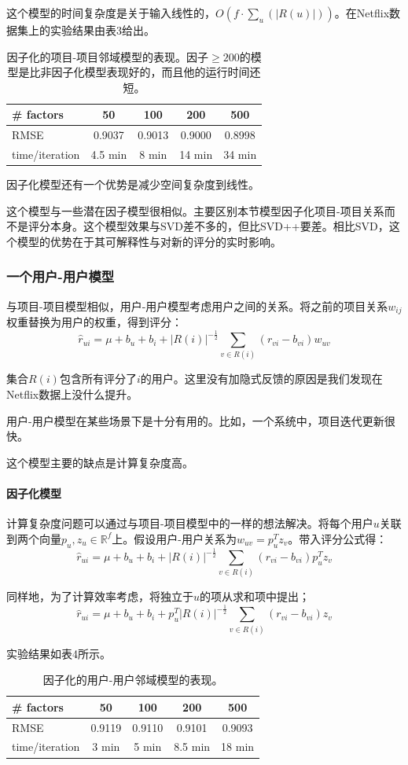 \documentclass{article}
\begin{document}
这个模型的时间复杂度是关于输入线性的，$O(f\cdot\sum_u(|R(u)|))$。在Netflix数据集上的实验结果由表3给出。
\begin{table}[htb]
\centering
\caption{因子化的项目-项目邻域模型的表现。因子$\geq 200$的模型是比非因子化模型表现好的，而且他的运行时间还短。}
\begin{tabular}{|l|c|c|c|c|}\hline
\# factors & 50 & 100 & 200 & 500 \\\hline
RMSE & 0.9037 & 0.9013 & 0.9000 & 0.8998 \\\hline
time/iteration & 4.5 min & 8 min & 14 min & 34 min \\\hline
\end{tabular}
\end{table}

因子化模型还有一个优势是减少空间复杂度到线性。

这个模型与一些潜在因子模型很相似。主要区别本节模型因子化项目-项目关系而不是评分本身。这个模型效果与SVD差不多的，但比SVD++要差。相比SVD，这个模型的优势在于其可解释性与对新的评分的实时影响。

\subsubsection{一个用户-用户模型}
与项目-项目模型相似，用户-用户模型考虑用户之间的关系。将之前的项目关系$w_{ij}$权重替换为用户的权重，得到评分：
$$ \hat{r}_{ui}=\mu+b_u+b_i+|R(i)|^{-\frac{1}{2}}\mathop{\sum}\limits_{v\in R(i)}(r_{vi}-b_{vi})w_{uv} $$

集合$R(i)$包含所有评分了$i$的用户。这里没有加隐式反馈的原因是我们发现在Netflix数据上没什么提升。

用户-用户模型在某些场景下是十分有用的。比如，一个系统中，项目迭代更新很快。

这个模型主要的缺点是计算复杂度高。

\paragraph{因子化模型}
计算复杂度问题可以通过与项目-项目模型中的一样的想法解决。将每个用户$u$关联到两个向量$p_u,z_u\in\mathbb{R}^f$上。假设用户-用户关系为$w_{uv}=p_u^Tz_v$。带入评分公式得：
$$ \hat{r}_{ui}=\mu+b_u+b_i+|R(i)|^{-\frac{1}{2}}\mathop{\sum}\limits_{v\in R(i)}(r_{vi}-b_{vi})p_u^Tz_v $$

同样地，为了计算效率考虑，将独立于$u$的项从求和项中提出；
$$ \hat{r}_{ui}=\mu+b_u+b_i+p_u^T|R(i)|^{-\frac{1}{2}}\mathop{\sum}\limits_{v\in R(i)}(r_{vi}-b_{vi})z_v $$

实验结果如表4所示。
\begin{table}[htb]
\centering
\caption{因子化的用户-用户邻域模型的表现。}
\begin{tabular}{|l|c|c|c|c|}\hline
\# factors & 50 & 100 & 200 & 500 \\\hline
RMSE & 0.9119 & 0.9110 & 0.9101 & 0.9093 \\\hline
time/iteration & 3 min & 5 min & 8.5 min & 18 min \\\hline
\end{tabular}
\end{table}
\end{document}
